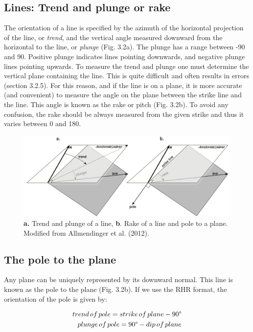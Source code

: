 \documentclass[a4paper , 12pt]{book}
\begin{document}
\subsection{Lines: Trend and plunge or rake}

The orientation of a line is specified by the azimuth of the horizontal projection of the line, or \textit{trend}, and the vertical angle measured downward from the horizontal to the line, or \textit{plunge} (Fig. 3.2a). The plunge has a range between -90 and 90\degree. Positive plunge indicates lines pointing downwards, and negative plunge lines pointing upwards. To measure the trend and plunge one must determine the vertical plane containing the line. This is quite difficult and often results in errors (section 3.2.5). For this reason, and if the line is on a plane, it is more accurate (and convenient) to measure the angle on the plane between the strike line and the line. This angle is known as the rake or pitch (Fig. 3.2b). To avoid any confusion, the rake should be always measured from the given strike and thus it varies between 0 and 180\degree.

\begin{figure}[ht]
    \centering
    \includegraphics[width=13cm]{Figures/ch3f2.png}
    \caption{\textbf{a.} Trend and plunge of a line, \textbf{b}. Rake of a line and pole to a plane. Modified from Allmendinger et al. (2012).}
\end{figure}

\subsection{The pole to the plane}

Any plane can be uniquely represented by its downward normal. This line is known as the pole to the plane (Fig. 3.2b). If we use the RHR format, the orientation of the pole is given by:

\begin{equation}
    \begin{split}
        trend\,of\,pole = strike\,of\,plane -90\degree \\
        plunge\,of\,pole = 90\degree - dip\,of\,plane
    \end{split}
\end{equation}
\end{document}
